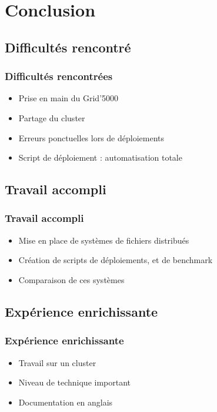 \documentclass[blue]{beamer}
\begin{document}
\section{Conclusion}
	\subsection{Difficultés rencontré}
	\begin{frame}
	\frametitle{Difficultés rencontrées}
		\begin{itemize}
			\item Prise en main du Grid'5000
			\item Partage du cluster
			\item Erreurs ponctuelles lors de déploiements
			\item Script de déploiement : automatisation totale
		\end{itemize}
	\end{frame}

	\subsection{Travail accompli}
	\begin{frame}
	\frametitle{Travail accompli}
		\begin{itemize}
			\item Mise en place de systèmes de fichiers distribués
			\item Création de scripts de déploiements, et de benchmark
			\item Comparaison de ces systèmes
		\end{itemize}
	\end{frame}

	\subsection{Expérience enrichissante}
	\begin{frame}
	\frametitle{Expérience enrichissante}
		\begin{itemize}
			\item Travail sur un cluster
			\item Niveau de technique important
			\item Documentation en anglais
		\end{itemize}
	\end{frame}
\end{document}
